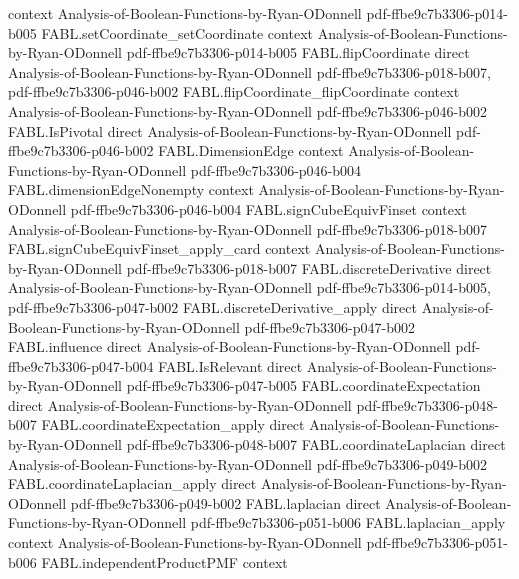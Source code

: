 \begin{theorem}
  {context}
  {Analysis-of-Boolean-Functions-by-Ryan-ODonnell}
  {pdf-ffbe9c7b3306-p014-b005}
\proofstep
  {FABL.setCoordinate_setCoordinate}
  {context}
  {Analysis-of-Boolean-Functions-by-Ryan-ODonnell}
  {pdf-ffbe9c7b3306-p014-b005}
\proofstep
  {FABL.flipCoordinate}
  {direct}
  {Analysis-of-Boolean-Functions-by-Ryan-ODonnell}
  {pdf-ffbe9c7b3306-p018-b007,
    pdf-ffbe9c7b3306-p046-b002}
\proofstep
  {FABL.flipCoordinate_flipCoordinate}
  {context}
  {Analysis-of-Boolean-Functions-by-Ryan-ODonnell}
  {pdf-ffbe9c7b3306-p046-b002}
\proofstep
  {FABL.IsPivotal}
  {direct}
  {Analysis-of-Boolean-Functions-by-Ryan-ODonnell}
  {pdf-ffbe9c7b3306-p046-b002}
\proofstep
  {FABL.DimensionEdge}
  {context}
  {Analysis-of-Boolean-Functions-by-Ryan-ODonnell}
  {pdf-ffbe9c7b3306-p046-b004}
\proofstep
  {FABL.dimensionEdgeNonempty}
  {context}
  {Analysis-of-Boolean-Functions-by-Ryan-ODonnell}
  {pdf-ffbe9c7b3306-p046-b004}
\proofstep
  {FABL.signCubeEquivFinset}
  {context}
  {Analysis-of-Boolean-Functions-by-Ryan-ODonnell}
  {pdf-ffbe9c7b3306-p018-b007}
\proofstep
  {FABL.signCubeEquivFinset_apply_card}
  {context}
  {Analysis-of-Boolean-Functions-by-Ryan-ODonnell}
  {pdf-ffbe9c7b3306-p018-b007}
\proofstep
  {FABL.discreteDerivative}
  {direct}
  {Analysis-of-Boolean-Functions-by-Ryan-ODonnell}
  {pdf-ffbe9c7b3306-p014-b005,
    pdf-ffbe9c7b3306-p047-b002}
\proofstep
  {FABL.discreteDerivative_apply}
  {direct}
  {Analysis-of-Boolean-Functions-by-Ryan-ODonnell}
  {pdf-ffbe9c7b3306-p047-b002}
\proofstep
  {FABL.influence}
  {direct}
  {Analysis-of-Boolean-Functions-by-Ryan-ODonnell}
  {pdf-ffbe9c7b3306-p047-b004}
\proofstep
  {FABL.IsRelevant}
  {direct}
  {Analysis-of-Boolean-Functions-by-Ryan-ODonnell}
  {pdf-ffbe9c7b3306-p047-b005}
\proofstep
  {FABL.coordinateExpectation}
  {direct}
  {Analysis-of-Boolean-Functions-by-Ryan-ODonnell}
  {pdf-ffbe9c7b3306-p048-b007}
\proofstep
  {FABL.coordinateExpectation_apply}
  {direct}
  {Analysis-of-Boolean-Functions-by-Ryan-ODonnell}
  {pdf-ffbe9c7b3306-p048-b007}
\proofstep
  {FABL.coordinateLaplacian}
  {direct}
  {Analysis-of-Boolean-Functions-by-Ryan-ODonnell}
  {pdf-ffbe9c7b3306-p049-b002}
\proofstep
  {FABL.coordinateLaplacian_apply}
  {direct}
  {Analysis-of-Boolean-Functions-by-Ryan-ODonnell}
  {pdf-ffbe9c7b3306-p049-b002}
\proofstep
  {FABL.laplacian}
  {direct}
  {Analysis-of-Boolean-Functions-by-Ryan-ODonnell}
  {pdf-ffbe9c7b3306-p051-b006}
\proofstep
  {FABL.laplacian_apply}
  {context}
  {Analysis-of-Boolean-Functions-by-Ryan-ODonnell}
  {pdf-ffbe9c7b3306-p051-b006}
\proofstep
  {FABL.independentProductPMF}
  {context}

\end{theorem}
